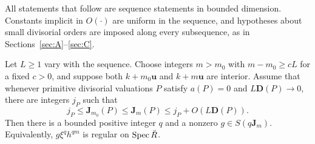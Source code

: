 All statements that follow are sequence statements in bounded dimension.
Constants implicit in $O(\cdot)$ are uniform in the sequence, and
hypotheses about small divisorial orders are imposed along every
subsequence, as in Sections~\ref{sec:A}--\ref{sec:C}.

\begin{proposition}\label{prop:D-sandwich}
Let $L\ge1$ vary with the sequence.  Choose integers $m>m_0$ with
$m-m_0\ge cL$ for a fixed $c>0$, and suppose both
$k+m_0\mathbf u$ and $k+m\mathbf u$ are interior.  Assume that whenever
primitive divisorial valuations $P$ satisfy $a(P)=0$ and
$L\mathbf D(P)\to0$, there are integers $j_P$ such that
\begin{equation}\label{eq:D-sandwich-hypothesis}
 j_P\le\mathbf J_{m_0}(P)\le\mathbf J_m(P)
       \le j_P+O(L\mathbf D(P)).
\end{equation}
Then there is a bounded positive integer $q$ and a nonzero
$g\in S(q\mathbf J_m)$.  Equivalently, $g\xi^qh^{qm}$ is regular on
$\operatorname{Spec}\breve R$.
\end{proposition}

